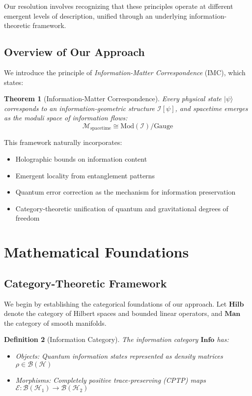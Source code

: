 \documentclass[12pt,a4paper]{article}
\newtheorem{theorem}{Theorem}[section]
\newtheorem{definition}[theorem]{Definition}
\begin{document}
Our resolution involves recognizing that these principles operate at different emergent levels of description, unified through an underlying information-theoretic framework.

\subsection{Overview of Our Approach}

We introduce the principle of \textit{Information-Matter Correspondence} (IMC), which states:
\begin{theorem}[Information-Matter Correspondence]
Every physical state $|\psi\rangle$ corresponds to an information-geometric structure $\mathcal{I}[\psi]$, and spacetime emerges as the moduli space of information flows:
\begin{equation}
\mathcal{M}_{\text{spacetime}} \cong \text{Mod}(\mathcal{I})/\text{Gauge}
\end{equation}
\end{theorem}

This framework naturally incorporates:
\begin{itemize}
\item Holographic bounds on information content
\item Emergent locality from entanglement patterns
\item Quantum error correction as the mechanism for information preservation
\item Category-theoretic unification of quantum and gravitational degrees of freedom
\end{itemize}

\section{Mathematical Foundations}

\subsection{Category-Theoretic Framework}

We begin by establishing the categorical foundations of our approach. Let $\mathbf{Hilb}$ denote the category of Hilbert spaces and bounded linear operators, and $\mathbf{Man}$ the category of smooth manifolds.

\begin{definition}[Information Category]
The information category $\mathbf{Info}$ has:
\begin{itemize}
\item Objects: Quantum information states represented as density matrices $\rho \in \mathcal{B}(\mathcal{H})$
\item Morphisms: Completely positive trace-preserving (CPTP) maps $\mathcal{E}: \mathcal{B}(\mathcal{H}_1) \to \mathcal{B}(\mathcal{H}_2)$
\end{itemize}
\end{definition}
\end{document}
